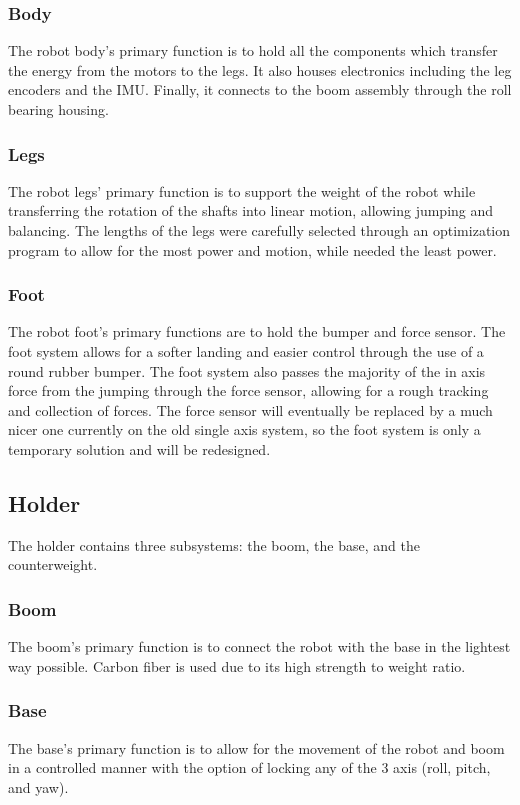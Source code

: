 \documentclass{report}
\begin{document}
\subsubsection[Body]{Body}
The robot body's primary function is to hold all the components which transfer the energy from the motors to the legs. It also houses electronics including the leg encoders and the IMU. Finally, it connects to the boom assembly through the roll bearing housing.
\subsubsection[Legs]{Legs}
The robot legs' primary function is to support the weight of the robot while transferring the rotation of the shafts into linear motion, allowing jumping and balancing. The lengths of the legs were carefully selected through an optimization program to allow for the most power and motion, while needed the least power.
\subsubsection[Foot]{Foot}
The robot foot's primary functions are to hold the bumper and force sensor. The foot system allows for a softer landing and easier control through the use of a round rubber bumper. The foot system also passes the majority of the in axis force from the jumping through the force sensor, allowing for a rough tracking and collection of forces. The force sensor will eventually be replaced by a much nicer one currently on the old single axis system, so the foot system is only a temporary solution and will be redesigned.

\subsection[Holder]{Holder}
The holder contains three subsystems: the boom, the base, and the counterweight.
\subsubsection[Boom]{Boom}
The boom's primary function is to connect the robot with the base in the lightest way possible. Carbon fiber is used due to its high strength to weight ratio.
\subsubsection[Base]{Base}
The base's primary function is to allow for the movement of the robot and boom in a controlled manner with the option of locking any of the 3 axis (roll, pitch, and yaw).
\end{document}
